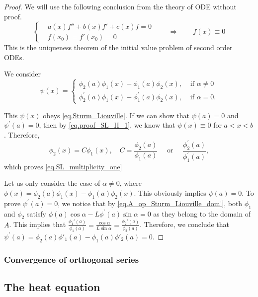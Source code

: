 \begin{proof}
We will use the following conclusion from the theory of ODE without proof. 
\begin{equation}\label{eq.proof_SL_II_1}
    \left\{
        \begin{aligned}
            &a(x)f'' + b(x)f' + c(x)f = 0
            \\
            & f(x_0) = f'(x_0) = 0
        \end{aligned}
    \right.\qquad\Rightarrow\qquad f(x)\equiv 0
\end{equation}
This is the uniqueness theorem of the initial value problem of second order ODEs.

We consider
$$
\psi(x)= \begin{cases}
    \phi_2(a) \phi_1(x)-\phi_1(a) \phi_2(x), & \text { if } \alpha \neq 0 
    \\ 
    \phi_2^{\prime}(a) \phi_1(x)-\phi_1^{\prime}(a) \phi_2(x), & \text { if } \alpha=0 .\end{cases}
$$

This $\psi(x)$ obeys \eqref{eq.Sturm_Liouville}. If we can show that $\psi(a)=0$ and $\psi^{\prime}(a)=0$, then by \eqref{eq.proof_SL_II_1}, we know that $\psi(x)\equiv 0$ for $ a<x<b$. Therefore,
\begin{equation}
    \phi_2(x)=C \phi_1(x), \quad C=\frac{\phi_2(a)}{\phi_1(a)} \quad \text { or } \quad \frac{\phi_2^{\prime}(a)}{\phi_1^{\prime}(a)},
\end{equation}
which proves \eqref{eq.SL_multiplicity_one}

Let us only consider the case of $\alpha \neq 0$, where $\phi(x) = \phi_2(a) \phi_1(x)-\phi_1(a) \phi_2(x)$. This obviously implies $\psi(a)=0$. To prove $\psi^{\prime}(a)=0$, we notice that by \eqref{eq.A_op_Sturm_Liouville_dom'}, both $\phi_1$ and $\phi_2$ satisfy $\phi(a) \cos \alpha-L \phi^{\prime}(a) \sin \alpha=0$ as they belong to the domain of $A$. This implies that $\frac{\phi_1'(a)}{\phi_1(a)} = \frac{\cos \alpha}{L\sin \alpha} = \frac{\phi_2'(a)}{\phi_2(a)}$. Therefore, we conclude that $\psi^{\prime}(a) = \phi_2(a) \phi'_1(a)-\phi_1(a) \phi'_2(a) =0$.
\end{proof}


\subsubsection{Convergence of orthogonal series}

\subsection{The heat equation}

